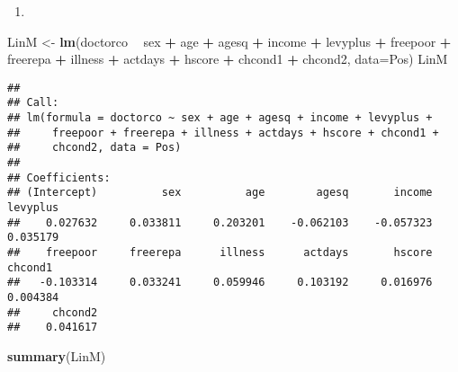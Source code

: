 \documentclass[
]{article}
\newenvironment{Shaded}{\begin{snugshade}}{\end{snugshade}}
\newcommand{\DataTypeTok}[1]{\textcolor[rgb]{0.13,0.29,0.53}{#1}}
\newcommand{\KeywordTok}[1]{\textcolor[rgb]{0.13,0.29,0.53}{\textbf{#1}}}
\newcommand{\NormalTok}[1]{#1}
\newcommand{\OperatorTok}[1]{\textcolor[rgb]{0.81,0.36,0.00}{\textbf{#1}}}
\newcommand{\StringTok}[1]{\textcolor[rgb]{0.31,0.60,0.02}{#1}}
\begin{document}
\begin{enumerate}
\def\labelenumi{\alph{enumi})}
\setcounter{enumi}{5}
\item
\end{enumerate}

\begin{Shaded}
\begin{Highlighting}[]
\NormalTok{LinM <-}\StringTok{ }\KeywordTok{lm}\NormalTok{(doctorco }\OperatorTok{~}\StringTok{ }\NormalTok{sex }\OperatorTok{+}\StringTok{ }\NormalTok{age }\OperatorTok{+}\StringTok{ }\NormalTok{agesq }\OperatorTok{+}\StringTok{ }\NormalTok{income }\OperatorTok{+}\StringTok{ }\NormalTok{levyplus }\OperatorTok{+}\StringTok{ }\NormalTok{freepoor }\OperatorTok{+}\StringTok{ }\NormalTok{freerepa }\OperatorTok{+}\StringTok{ }\NormalTok{illness }\OperatorTok{+}\StringTok{ }\NormalTok{actdays }\OperatorTok{+}\StringTok{ }\NormalTok{hscore }\OperatorTok{+}\StringTok{ }\NormalTok{chcond1 }\OperatorTok{+}\StringTok{ }\NormalTok{chcond2, }\DataTypeTok{data=}\NormalTok{Pos)}
\NormalTok{LinM}
\end{Highlighting}
\end{Shaded}

\begin{verbatim}
## 
## Call:
## lm(formula = doctorco ~ sex + age + agesq + income + levyplus + 
##     freepoor + freerepa + illness + actdays + hscore + chcond1 + 
##     chcond2, data = Pos)
## 
## Coefficients:
## (Intercept)          sex          age        agesq       income     levyplus  
##    0.027632     0.033811     0.203201    -0.062103    -0.057323     0.035179  
##    freepoor     freerepa      illness      actdays       hscore      chcond1  
##   -0.103314     0.033241     0.059946     0.103192     0.016976     0.004384  
##     chcond2  
##    0.041617
\end{verbatim}

\begin{Shaded}
\begin{Highlighting}[]
\KeywordTok{summary}\NormalTok{(LinM)}
\end{Highlighting}
\end{Shaded}
\end{document}
